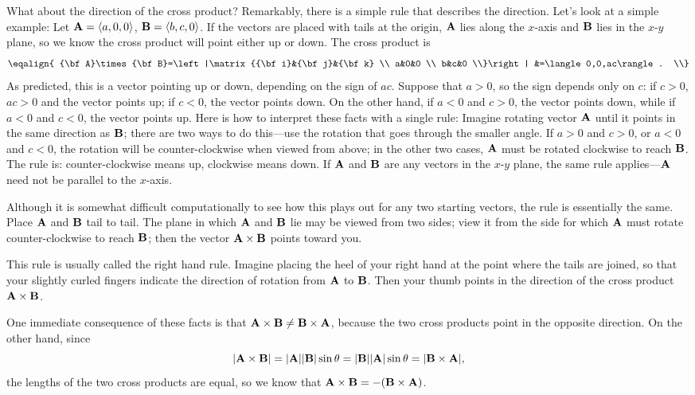 What about the direction of the cross product? Remarkably, there is a
simple rule that describes the direction. Let's look at a simple
example: Let ${\bf A}=\langle a,0,0\rangle$, ${\bf B}=\langle 
b,c,0\rangle$. If the vectors are placed with tails at the origin,
$\bf A$ lies along the $x$-axis and $\bf B$ lies in the $x$-$y$ plane,
so we know the cross product will point either up or down. The cross
product is 
$$\eqalign{
  {\bf A}\times {\bf B}=\left|\matrix{{\bf i}&{\bf j}&{\bf k} \\
  a&0&0 \\
  b&c&0 \\}\right|
  &=\langle
  0,0,ac\rangle. \\}
$$
As predicted, this is a vector pointing up or down, depending on the
sign of $ac$. Suppose that $a>0$, so the sign depends only on $c$: if
$c>0$, $ac>0$ and the vector points up; if $c<0$, the vector points
down. On the other hand, if $a<0$ and $c>0$, the vector points down,
while if $a<0$ and $c<0$, the vector points up. Here is how to
interpret these facts with a single rule: Imagine rotating vector
$\bf A$ until it points in the same direction as $\bf B$; there are
two ways to do this---use the rotation that goes through the smaller
angle. If $a>0$ and $c>0$, or $a<0$ and $c<0$, the rotation will be
counter-clockwise when viewed from above; in the other two cases, $\bf
A$ must be rotated clockwise to reach $\bf B$. The rule is:
counter-clockwise means up, clockwise means down. If $\bf A$ and $\bf
B$ are any vectors in the $x$-$y$ plane, the same rule applies---$\bf
A$ need not be parallel to the $x$-axis.

Although it is somewhat difficult computationally to see how this
plays out for any two starting vectors, the rule is essentially the
same. Place $\bf A$ and $\bf B$ tail to tail. The plane in which $\bf
A$ and $\bf B$ lie may be viewed from two sides; view it from the side
for which $\bf A$ must rotate counter-clockwise to reach $\bf B$; then
the vector ${\bf A}\times{\bf B}$ points toward you.

This rule is usually called the {\dfont right hand rule}.
Imagine placing the heel of your right hand at the point where the tails are
joined, so that your slightly curled fingers indicate the direction of
rotation from $\bf A$ to $\bf B$. Then your thumb points in the
direction of the cross product ${\bf A}\times{\bf B}$.

One immediate consequence of these facts is that 
${\bf A}\times{\bf B}\not={\bf B}\times{\bf A}$, because the two
cross products point in the opposite direction. On the other hand,
since 
$$
  |{\bf A}\times{\bf B}|=|{\bf A}||{\bf B}|\sin\theta
  =|{\bf B}||{\bf A}|\sin\theta=|{\bf B}\times{\bf A}|,
$$
the lengths of the two cross products are equal, so
we know that ${\bf A}\times{\bf B}=-({\bf B}\times{\bf A})$.

